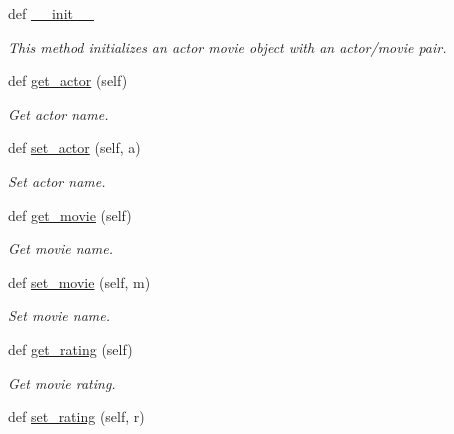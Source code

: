 \begin{DoxyCompactItemize}
\item 
def \hyperlink{class_bridges_1_1data__src__dependent_1_1actor__movie__imdb_1_1_actor_movie_i_m_d_b_adf5acf30aad3c86b0d7f64abd0c70a77}{\+\_\+\+\_\+init\+\_\+\+\_\+}
\begin{DoxyCompactList}\small\item\em This method initializes an actor movie object with an actor/movie pair. \end{DoxyCompactList}\item 
def \hyperlink{class_bridges_1_1data__src__dependent_1_1actor__movie__imdb_1_1_actor_movie_i_m_d_b_a0fa44336a8995ef58a912d0d3a74ac38}{get\+\_\+actor} (self)
\begin{DoxyCompactList}\small\item\em Get actor name. \end{DoxyCompactList}\item 
def \hyperlink{class_bridges_1_1data__src__dependent_1_1actor__movie__imdb_1_1_actor_movie_i_m_d_b_a205ff2cf0b7a9f8a3d9a3564112261ee}{set\+\_\+actor} (self, a)
\begin{DoxyCompactList}\small\item\em Set actor name. \end{DoxyCompactList}\item 
def \hyperlink{class_bridges_1_1data__src__dependent_1_1actor__movie__imdb_1_1_actor_movie_i_m_d_b_ae4062d5e45e1bfd82759bc53da41d186}{get\+\_\+movie} (self)
\begin{DoxyCompactList}\small\item\em Get movie name. \end{DoxyCompactList}\item 
def \hyperlink{class_bridges_1_1data__src__dependent_1_1actor__movie__imdb_1_1_actor_movie_i_m_d_b_ad3c654091ca701fb2432ee91c204c7dc}{set\+\_\+movie} (self, m)
\begin{DoxyCompactList}\small\item\em Set movie name. \end{DoxyCompactList}\item 
def \hyperlink{class_bridges_1_1data__src__dependent_1_1actor__movie__imdb_1_1_actor_movie_i_m_d_b_a9307e48dbef2215f1dd1604e82cdfbbc}{get\+\_\+rating} (self)
\begin{DoxyCompactList}\small\item\em Get movie rating. \end{DoxyCompactList}\item 
def \hyperlink{class_bridges_1_1data__src__dependent_1_1actor__movie__imdb_1_1_actor_movie_i_m_d_b_aa8dcd594893d77e7774fd7f43e7a3fc6}{set\+\_\+rating} (self, r)

\end{DoxyCompactItemize}
